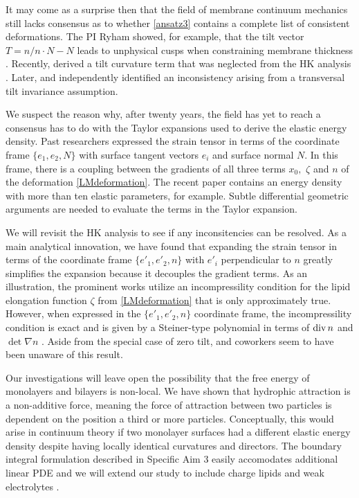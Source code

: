  It may come as a surprise then that the field of membrane continuum mechanics still lacks consensus as to
  whether \eqref{ansatz3} contains a complete list of consistent deformations.
  The PI Ryham showed, for example, that the tilt vector $T = n/n\cdot N - N$ leads to unphysical cusps when constraining membrane thickness
 \cite{RyKlYaCo16}.
  Recently, \cite{TerziDeserno17} derived a tilt curvature term that was neglected from the HK analysis \cite{Hamm2000}.
  Later, \cite{C9SM02079A} 
  and \cite{PhysRevE.102.042406} independently identified an inconsistency \cite{TerziDeserno17} arising
  from a transversal tilt invariance assumption. 

  We suspect the reason why, after twenty years, the field has yet to reach a consensus 
  has to do with the Taylor expansions used to derive the elastic energy density. 
  Past researchers expressed the strain tensor in
  terms of the coordinate frame $\{e_1, e_2, N\}$ with surface tangent vectors $e_i$ and surface normal $N$.  
  In this frame, there is a coupling between the gradients of all three terms $x_0,$ $\zeta$ and $n$ of the deformation \eqref{LMdeformation}.
  The recent paper \cite{PhysRevE.102.042406} contains an energy density with more than ten elastic parameters, for example.
  Subtle differential geometric arguments are needed to evaluate the terms in the Taylor expansion.

  We will revisit the HK analysis to see if any inconsitencies can be resolved.
  As a main analytical innovation, we have found that expanding the strain tensor in
  terms of the coordinate frame $\{e'_1, e'_2, n\}$ with $e'_i$ perpendicular to $n$
  greatly simplifies the expansion because it decouples the gradient terms. As an illustration, the prominent works
  \cite{TerziDeserno17, PhysRevE.102.042406, Hamm2000, C9SM02079A} utilize an
  incompressility condition for the lipid elongation function $\zeta$ from \eqref{LMdeformation} that is only approximately true. 
  However, when expressed in the $\{e'_1, e'_2, n\}$ coordinate frame, the incompressility condition is exact
  and is given by a Steiner-type polynomial in terms of $\operatorname{div} n$ and $\det \nabla n$ \cite{Fe59}.
  Aside from the special case of zero tilt, \cite{Hamm2000} and coworkers seem to have been unaware of this result.

Our investigations will leave open the possibility that the free energy of monolayers and bilayers is non-local. 
We have shown that hydrophic attraction is a non-additive force, meaning the force of attraction between two
particles is dependent on the position a third or more particles. Conceptually, this would arise in continuum theory if two monolayer surfaces
had a different elastic energy density despite having locally identical curvatures and directors.
The boundary integral formulation described in Specific Aim 3 easily accomodates additional linear PDE and
we will extend our study to include charge lipids and weak electrolytes \cite{C9SM00772E}.

